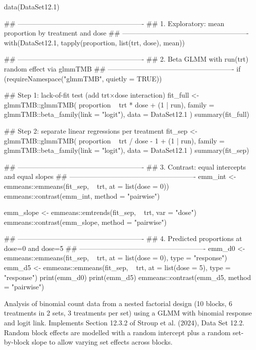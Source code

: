 \documentclass[a4paper]{book}
\begin{document}
%
\begin{Examples}
\begin{ExampleCode}
data(DataSet12.1)

## -------------------------------------------------------
## 1. Exploratory: mean proportion by treatment and dose
## -------------------------------------------------------
with(DataSet12.1, tapply(proportion, list(trt, dose), mean))

## -------------------------------------------------------
## 2. Beta GLMM with run(trt) random effect via glmmTMB
## -------------------------------------------------------
if (requireNamespace("glmmTMB", quietly = TRUE)) {

  ## Step 1: lack-of-fit test (add trt×dose interaction)
  fit_full <- glmmTMB::glmmTMB(
    proportion ~ trt * dose + (1 | run),
    family = glmmTMB::beta_family(link = "logit"),
    data   = DataSet12.1
  )
  summary(fit_full)

  ## Step 2: separate linear regressions per treatment
  fit_sep <- glmmTMB::glmmTMB(
    proportion ~ trt / dose - 1 + (1 | run),
    family = glmmTMB::beta_family(link = "logit"),
    data   = DataSet12.1
  )
  summary(fit_sep)

  ## -------------------------------------------------------
  ## 3. Contrast: equal intercepts and equal slopes
  ## -------------------------------------------------------
  emm_int <- emmeans::emmeans(fit_sep, ~ trt, at = list(dose = 0))
  emmeans::contrast(emm_int, method = "pairwise")

  emm_slope <- emmeans::emtrends(fit_sep, ~ trt, var = "dose")
  emmeans::contrast(emm_slope, method = "pairwise")

  ## -------------------------------------------------------
  ## 4. Predicted proportions at dose=0 and dose=5
  ## -------------------------------------------------------
  emm_d0 <- emmeans::emmeans(fit_sep, ~ trt, at = list(dose = 0),
                              type = "response")
  emm_d5 <- emmeans::emmeans(fit_sep, ~ trt, at = list(dose = 5),
                              type = "response")
  print(emm_d0)
  print(emm_d5)
  emmeans::contrast(emm_d5, method = "pairwise")
}
\end{ExampleCode}
\end{Examples}
%
\begin{Description}
Analysis of binomial count data from a nested factorial design (10 blocks,
6 treatments in 2 sets, 3 treatments per set) using a GLMM with binomial
response and logit link.  Implements Section 12.3.2 of Stroup et al. (2024),
Data Set 12.2.  Random block effects are modelled with a random intercept
plus a random set-by-block slope to allow varying set effects across blocks.
\end{Description}
\end{document}
